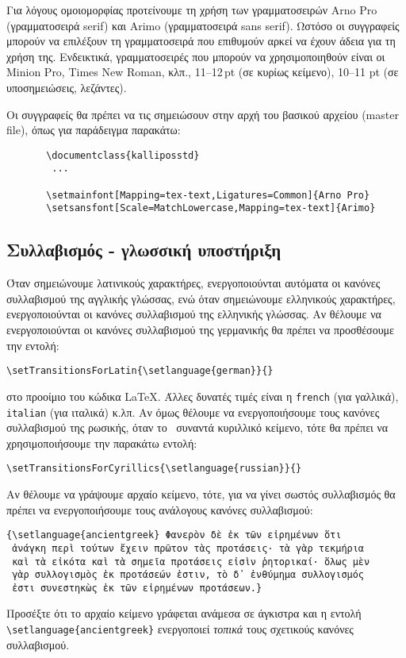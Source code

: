 \begin{refsection}
Για λόγους ομοιομορφίας προτείνουμε τη χρήση των γραμματοσειρών Arno Pro (γραμματοσειρά serif) και Arimo
(γραμματοσειρά sans serif). Ωστόσο οι συγγραφείς μπορούν να επιλέξουν τη γραμματοσειρά που επιθυμούν αρκεί να
έχουν άδεια για τη χρήση της.
Ενδεικτικά, γραμματοσειρές που μπορούν να χρησιμοποιηθούν είναι οι Minion Pro, Times
New  Roman, κλπ., 11--12\,pt (σε κυρίως κείμενο), 10--11 pt (σε υποσημειώσεις, λεζάντες).

Οι συγγραφείς θα πρέπει να τις σημειώσουν στην αρχή του βασικού αρχείου (master file), όπως για παράδειγμα
παρακάτω:
\begin{verbatim}
       \documentclass{kalliposstd}
        ...
       
       \setmainfont[Mapping=tex-text,Ligatures=Common]{Arno Pro}
       \setsansfont[Scale=MatchLowercase,Mapping=tex-text]{Arimo}
\end{verbatim}
\subsection{Συλλαβισμός - γλωσσική υποστήριξη}
Όταν σημειώνουμε λατινικούς χαρακτήρες, ενεργοποιούνται αυτόματα οι κανόνες συλλαβισμού της αγγλικής γλώσσας,
ενώ όταν σημειώνουμε ελληνικούς χαρακτήρες, ενεργοποιούνται οι κανόνες συλλαβισμού της
ελληνικής γλώσσας. Αν θέλουμε να ενεργοποιούνται οι κανόνες συλλαβισμού της γερμανικής θα πρέπει
να προσθέσουμε την εντολή:
\begin{center}
\verb=\setTransitionsForLatin{\setlanguage{german}}{}=
\end{center}
στο προοίμιο του κώδικα \LaTeX. Άλλες δυνατές τιμές είναι η \texttt{french} (για γαλλικά),
\texttt{italian} (για ιταλικά) κ.λπ.
Αν όμως θέλουμε να ενεργοποιήσουμε τους κανόνες συλλαβισμού της ρωσικής, όταν το \XeLaTeX\
συναντά κυριλλικό κείμενο, τότε θα πρέπει να χρησιμοποιήσουμε την παρακάτω εντολή:
\begin{center}
\verb=\setTransitionsForCyrillics{\setlanguage{russian}}{}=
\end{center}
Αν θέλουμε να γράψουμε αρχαίο κείμενο, τότε, για να γίνει σωστός συλλαβισμός θα πρέπει να
ενεργοποιήσουμε τους ανάλογους κανόνες συλλαβισμού:
\begin{verbatim}
{\setlanguage{ancientgreek} Φανερὸν δὲ ἐκ τῶν εἰρημένων ὅτι
 ἀνάγκη περὶ τούτων ἔχειν πρῶτον τὰς προτάσεις· τὰ γὰρ τεκμήρια
 καὶ τὰ εἰκότα καὶ τὰ σημεῖα προτάσεις εἰσὶν ῥητορικαί· ὅλως μὲν
 γὰρ συλλογισμὸς ἐκ προτάσεών ἐστιν, τὸ δ᾽ ἐνθύμημα συλλογισμός
 ἐστι συνεστηκὼς ἐκ τῶν εἰρημένων προτάσεων.}
\end{verbatim}
Προσέξτε ότι το αρχαίο κείμενο γράφεται ανάμεσα σε άγκιστρα και η εντολή \verb=\setlanguage{ancientgreek}=
ενεργοποιεί {\em τοπικά} τους σχετικούς κανόνες συλλαβισμού.


\end{refsection}
